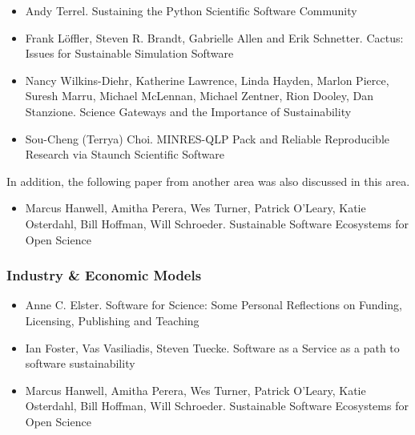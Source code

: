 \documentclass[11pt, oneside]{amsart}
\begin{document}
\begin{itemize}
\item Andy Terrel. Sustaining the Python Scientific Software
  Community~\cite{Terrel_WSSSPE}

\item Frank L\"{o}ffler, Steven R. Brandt, Gabrielle Allen and Erik
  Schnetter. Cactus: Issues for Sustainable Simulation
  Software~\cite{Loffler_WSSSPE}

\item Nancy Wilkins-Diehr, Katherine Lawrence, Linda Hayden, Marlon
  Pierce, Suresh Marru, Michael McLennan, Michael Zentner, Rion
  Dooley, Dan Stanzione. Science Gateways and the Importance of
  Sustainability~\cite{Wilkins-Diehr_WSSSPE}


\item Sou-Cheng (Terrya) Choi. MINRES-QLP Pack and Reliable
  Reproducible Research via Staunch Scientific Software~\cite{Choi_WSSSPE}


\end{itemize}

In addition, the following paper from another area was also discussed
in this area.

\begin{itemize}

\item Marcus Hanwell, Amitha Perera, Wes Turner, Patrick O'Leary,
  Katie Osterdahl, Bill Hoffman, Will Schroeder. Sustainable Software
  Ecosystems for Open Science~\cite{Hanwell_WSSSPE}

\end{itemize}

\subsubsection*{Industry \& Economic Models}

\begin{itemize}

\item Anne C. Elster. Software for Science: Some Personal
  Reflections on Funding, Licensing, Publishing and Teaching~\cite{Elster_WSSSPE}

\item Ian Foster, Vas Vasiliadis, Steven Tuecke. Software as a Service
  as a path to software sustainability~\cite{Foster_WSSSPE}

\item Marcus Hanwell, Amitha Perera, Wes Turner, Patrick O'Leary,
  Katie Osterdahl, Bill Hoffman, Will Schroeder. Sustainable Software
  Ecosystems for Open Science~\cite{Hanwell_WSSSPE}

\end{itemize}
\end{document}
